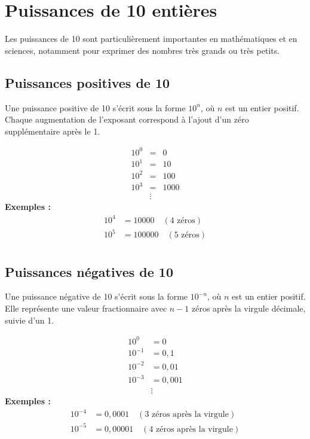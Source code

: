 \documentclass{article}
\begin{document}
\section{Puissances de 10 entières}

Les puissances de 10 sont particulièrement importantes en mathématiques et en sciences,
notamment pour exprimer des nombres très grands ou très petits.

\subsection{Puissances positives de 10}

 Une puissance positive de 10 s'écrit sous la forme \( 10^n \), où \( n \) est un entier positif. Chaque augmentation de l'exposant correspond à l'ajout d'un zéro supplémentaire après le 1.

 \[
\begin{aligned}
10^0 &= &0 \\
10^1 &= &10 \\
10^2 &= &100 \\
10^3 &= &1000 \\
&\vdots
\end{aligned}
\]
\vfill
\textbf{Exemples :}
\begin{align*}
10^4 &= 10000 \quad (\text{4 zéros}) \\
10^5 &= 100000 \quad (\text{5 zéros}) \\
\end{align*}

\subsection{Puissances négatives de 10}

 Une puissance négative de 10 s'écrit sous la forme \( 10^{-n} \), où \( n \) est un entier positif. Elle représente une valeur fractionnaire avec \( n-1 \) zéros après la virgule décimale, suivie d'un 1.

\begin{align*}
10^{0} &= 0 \\
10^{-1} &= 0,1 \\
10^{-2} &= 0,01 \\
10^{-3} &= 0,001 \\
&\vdots
\end{align*}
\vfill
\textbf{Exemples :}
\begin{align*}
10^{-4} &= 0,0001 \quad (\text{3 zéros après la virgule}) \\
10^{-5} &= 0,00001 \quad (\text{4 zéros après la virgule}) \\
\end{align*}
\end{document}
